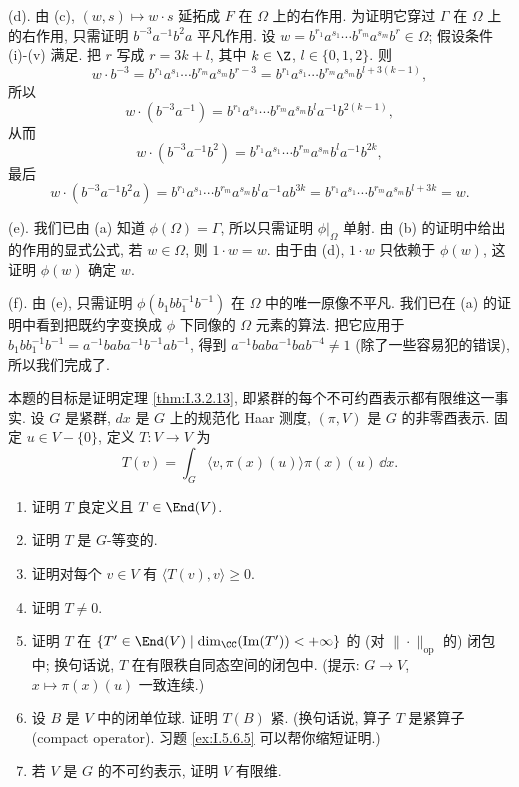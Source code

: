 \begin{solution}
(d). 由 (c), $(w, s) \longmapsto w \cdot s$ 延拓成 $F$ 在 $\Omega$ 上的右作用. 为证明它穿过 $\Gamma$ 在 $\Omega$ 上的右作用, 只需证明 $b^{-3}a^{-1}b^2a$ 平凡作用. 设 $w = b^{r_1}a^{s_1}\cdots b^{r_m}a^{s_m}b^r \in \Omega$; 假设条件 (i)-(v) 满足. 把 $r$ 写成 $r = 3k + l$, 其中 $k \in \Z$, $l \in \{0, 1, 2\}$. 则
\[
w \cdot b^{-3} = b^{r_1}a^{s_1}\cdots b^{r_m}a^{s_m}b^{r-3} = b^{r_1}a^{s_1}\cdots b^{r_m}a^{s_m}b^{l+3(k-1)},
\]
所以
\[
w \cdot (b^{-3}a^{-1}) = b^{r_1}a^{s_1}\cdots b^{r_m}a^{s_m}b^la^{-1}b^{2(k-1)},
\]
从而
\[
w \cdot (b^{-3}a^{-1}b^2) = b^{r_1}a^{s_1}\cdots b^{r_m}a^{s_m}b^la^{-1}b^{2k},
\]
最后
\[
w \cdot (b^{-3}a^{-1}b^2a) = b^{r_1}a^{s_1}\cdots b^{r_m}a^{s_m}b^la^{-1}ab^{3k} = b^{r_1}a^{s_1}\cdots b^{r_m}a^{s_m}b^{l+3k} = w.
\]

(e). 我们已由 (a) 知道 $\phi(\Omega) = \Gamma$, 所以只需证明 $\phi|_{\Omega}$ 单射. 由 (b) 的证明中给出的作用的显式公式, 若 $w \in \Omega$, 则 $1 \cdot w = w$. 由于由 (d), $1 \cdot w$ 只依赖于 $\phi(w)$, 这证明 $\phi(w)$ 确定 $w$.

(f). 由 (e), 只需证明 $\phi(b_1bb_1^{-1}b^{-1})$ 在 $\Omega$ 中的唯一原像不平凡. 我们已在 (a) 的证明中看到把既约字变换成 $\phi$ 下同像的 $\Omega$ 元素的算法. 把它应用于 $b_1bb_1^{-1}b^{-1} = a^{-1}baba^{-1}b^{-1}ab^{-1}$, 得到 $a^{-1}baba^{-1}bab^{-4} \neq 1$ (除了一些容易犯的错误), 所以我们完成了.
\end{solution}

\begin{exercise}[紧群的不可约酉表示有限维]
\label{ex:I.5.5.9}
本题的目标是证明定理 \ref{thm:I.3.2.13}, 即紧群的每个不可约酉表示都有限维这一事实.
设 $G$ 是紧群, $dx$ 是 $G$ 上的规范化 Haar 测度, $(\pi, V)$ 是 $G$ 的非零酉表示. 固定 $u \in V - \{0\}$, 定义 $T \colon V \to V$ 为
\[
T(v) = \int_G \langle v, \pi(x)(u) \rangle\pi(x)(u)\,\dd x.
\]
\begin{enumerate}
\item[(a)] 证明 $T$ 良定义且 $T \in \End(V)$.
\item[(b)] 证明 $T$ 是 $G$-等变的.
\item[(c)] 证明对每个 $v \in V$ 有 $\langle T(v), v \rangle \geq 0$.
\item[(d)] 证明 $T \neq 0$.
\item[(e)] 证明 $T$ 在 $\{T' \in \End(V) \mid \dim_{\CC}(\Im(T')) < +\infty\}$ 的 (对 $\|\cdot\|_{\mathrm{op}}$ 的) 闭包中; 换句话说, $T$ 在有限秩自同态空间的闭包中. (提示: $G \to V$, $x \longmapsto \pi(x)(u)$ 一致连续.)
\item[(f)] 设 $B$ 是 $V$ 中的闭单位球. 证明 $T(B)$ 紧. (换句话说, 算子 $T$ 是紧算子 (compact operator). 习题 \ref{ex:I.5.6.5} 可以帮你缩短证明.)
\item[(g)] 若 $V$ 是 $G$ 的不可约表示, 证明 $V$ 有限维.
\end{enumerate}
\end{exercise}

